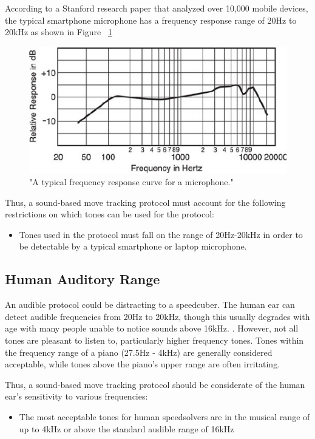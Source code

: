According to a Stanford research paper that analyzed over 10,000 mobile devices, the typical smartphone microphone has a frequency response range of 20Hz to 20kHz as shown in Figure ~\ref{fig:freq-res-range}

\begin{figure}[h]
    \centering
    \includegraphics[width=.50\linewidth]{Figures/4 Protocol Design/Frequency Response Range/typical-smartphone-response-range.png}
    \decoRule
    \caption{"A typical frequency response curve for a microphone." \cite{typical-mic-range}}
    \label{fig:freq-res-range}
\end{figure}

Thus, a sound-based move tracking protocol must account for the following restrictions on which tones can be used for the protocol:
\begin{itemize}
    \item Tones used in the protocol must fall on the range of 20Hz-20kHz in order to be detectable by a typical smartphone or laptop microphone.
\end{itemize}

\subsection{Human Auditory Range}
\label{subsec:human-auditory-range}
An audible protocol could be distracting to a speedcuber. 
The human ear can detect audible frequencies from 20Hz to 20kHz, though this usually degrades with age with many people unable to notice sounds above 16kHz. \cite{audible-range}.
However, not all tones are pleasant to listen to, particularly higher frequency tones.
Tones within the frequency range of a piano (27.5Hz - 4kHz) are generally considered acceptable, while tones above the piano's upper range are often irritating. \cite{piano-range}

Thus, a sound-based move tracking protocol should be considerate of the human ear's sensitivity to various frequencies:
\begin{itemize}
    \item The most acceptable tones for human speedsolvers are in the musical range of up to 4kHz or above the standard audible range of 16kHz
\end{itemize}


